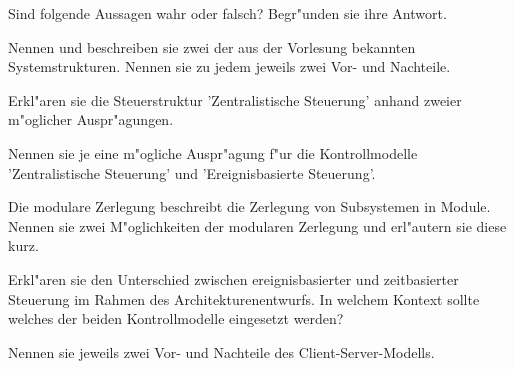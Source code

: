 \documentclass[12pt]{exam}
\begin{document}
\begin{questions}

\question[4] Sind folgende Aussagen wahr oder falsch? Begr"unden sie ihre Antwort.
\addpoints
{}

\question[6] Nennen und beschreiben sie zwei der aus der Vorlesung bekannten Systemstrukturen. Nennen sie zu jedem jeweils zwei Vor- und Nachteile.
\addpoints

\question[4] Erkl"aren sie die Steuerstruktur 'Zentralistische Steuerung' anhand zweier m"oglicher Auspr"agungen.
\addpoints

\question[2] Nennen sie je eine m"ogliche Auspr"agung f"ur die Kontrollmodelle 'Zentralistische Steuerung' und 'Ereignisbasierte Steuerung'.
\addpoints

\question[4] Die modulare Zerlegung beschreibt die Zerlegung von Subsystemen in Module. Nennen sie zwei M"oglichkeiten der modularen Zerlegung und erl"autern sie diese kurz.
\addpoints

\question[4] Erkl"aren sie den Unterschied zwischen ereignisbasierter und zeitbasierter Steuerung im Rahmen des Architekturenentwurfs. In welchem Kontext sollte welches der beiden Kontrollmodelle eingesetzt werden?
\addpoints

\question[4] Nennen sie jeweils zwei Vor- und Nachteile des Client-Server-Modells.
\addpoints


\end{questions}
\end{document}

